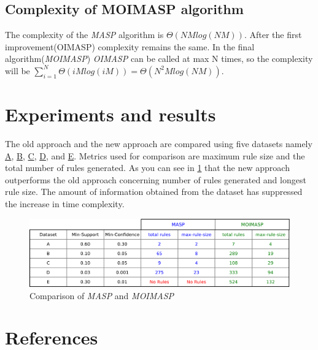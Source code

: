 \documentclass[review]{elsarticle}
\begin{document}
\subsection{Complexity of MOIMASP algorithm}
The complexity of the \emph{MASP} algorithm \cite{oldmasp} is $ \Theta(NMlog(NM)) $. After the first improvement(OIMASP) complexity remains the same. In the final algorithm(\emph{MOIMASP}) \emph{OIMASP} can be called at max N times, so the complexity will be $ \displaystyle\sum_{i=1}^{N} \Theta(iMlog(iM)) = \Theta(N^{2}Mlog(NM)) $.

\section{Experiments and results}
The old approach and the new approach are compared using five datasets namely \href{https://github.com/cryptomanic/MOIMASP-datasets/blob/master/A.csv}{A}, \href{https://github.com/cryptomanic/MOIMASP-datasets/blob/master/B.csv}{B}, \href{https://github.com/cryptomanic/MOIMASP-datasets/blob/master/C.csv}{C}, \href{https://github.com/cryptomanic/MOIMASP-datasets/blob/master/D.csv}{D}, and \href{https://github.com/cryptomanic/MOIMASP-datasets/blob/master/E.csv}{E}. Metrics used for comparison are maximum rule size and the total number of rules generated. As you can see in \ref{Fig 11} that the new approach outperforms the old approach concerning number of rules generated and longest rule size. The amount of information obtained from the dataset has suppressed the increase in time complexity.

\begin{figure}
\begin{center}
\includegraphics[scale=0.30]{pdf/comparison}
\end{center}
\caption{Comparison of \emph{MASP} and \emph{MOIMASP}}
\label{Fig 11}
\end{figure}

\section*{References}


\end{document}
